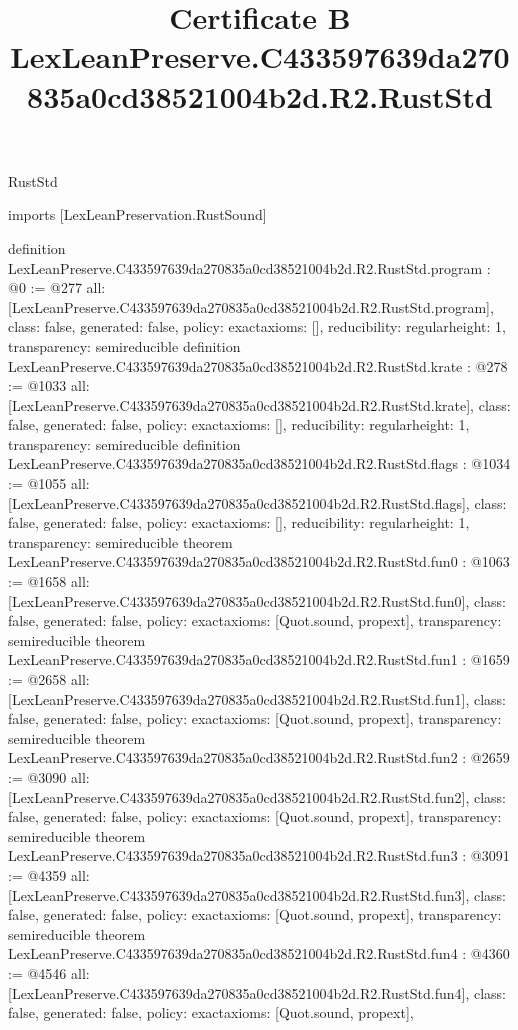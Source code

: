 \begin{lexlean}{RustStd}
\title{Certificate B LexLeanPreserve.C433597639da270835a0cd38521004b2d.R2.RustStd}
\begin{coremodule}
imports [LexLeanPreservation.RustSound]

definition LexLeanPreserve.C433597639da270835a0cd38521004b2d.R2.RustStd.program : @0 := @277 {
  all: [LexLeanPreserve.C433597639da270835a0cd38521004b2d.R2.RustStd.program],
  class: false,
  generated: false,
  policy: exact{axioms: []},
  reducibility: regular{height: 1},
  transparency: semireducible
}
definition LexLeanPreserve.C433597639da270835a0cd38521004b2d.R2.RustStd.krate : @278 := @1033 {
  all: [LexLeanPreserve.C433597639da270835a0cd38521004b2d.R2.RustStd.krate],
  class: false,
  generated: false,
  policy: exact{axioms: []},
  reducibility: regular{height: 1},
  transparency: semireducible
}
definition LexLeanPreserve.C433597639da270835a0cd38521004b2d.R2.RustStd.flags : @1034 := @1055 {
  all: [LexLeanPreserve.C433597639da270835a0cd38521004b2d.R2.RustStd.flags],
  class: false,
  generated: false,
  policy: exact{axioms: []},
  reducibility: regular{height: 1},
  transparency: semireducible
}
theorem LexLeanPreserve.C433597639da270835a0cd38521004b2d.R2.RustStd.fun0 : @1063 := @1658 {
  all: [LexLeanPreserve.C433597639da270835a0cd38521004b2d.R2.RustStd.fun0],
  class: false,
  generated: false,
  policy: exact{axioms: [Quot.sound, propext]},
  transparency: semireducible
}
theorem LexLeanPreserve.C433597639da270835a0cd38521004b2d.R2.RustStd.fun1 : @1659 := @2658 {
  all: [LexLeanPreserve.C433597639da270835a0cd38521004b2d.R2.RustStd.fun1],
  class: false,
  generated: false,
  policy: exact{axioms: [Quot.sound, propext]},
  transparency: semireducible
}
theorem LexLeanPreserve.C433597639da270835a0cd38521004b2d.R2.RustStd.fun2 : @2659 := @3090 {
  all: [LexLeanPreserve.C433597639da270835a0cd38521004b2d.R2.RustStd.fun2],
  class: false,
  generated: false,
  policy: exact{axioms: [Quot.sound, propext]},
  transparency: semireducible
}
theorem LexLeanPreserve.C433597639da270835a0cd38521004b2d.R2.RustStd.fun3 : @3091 := @4359 {
  all: [LexLeanPreserve.C433597639da270835a0cd38521004b2d.R2.RustStd.fun3],
  class: false,
  generated: false,
  policy: exact{axioms: [Quot.sound, propext]},
  transparency: semireducible
}
theorem LexLeanPreserve.C433597639da270835a0cd38521004b2d.R2.RustStd.fun4 : @4360 := @4546 {
  all: [LexLeanPreserve.C433597639da270835a0cd38521004b2d.R2.RustStd.fun4],
  class: false,
  generated: false,
  policy: exact{axioms: [Quot.sound, propext]},
}
\end{coremodule}
\end{lexlean}
